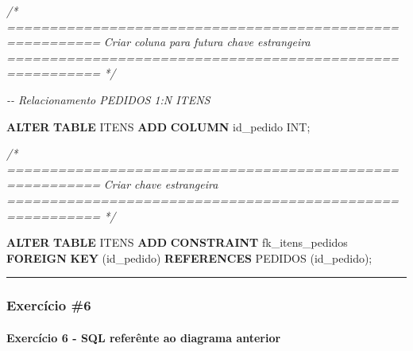 \documentclass[
]{book}
\newenvironment{Shaded}{\begin{snugshade}}{\end{snugshade}}
\newcommand{\CommentTok}[1]{\textcolor[rgb]{0.56,0.35,0.01}{\textit{#1}}}
\newcommand{\DataTypeTok}[1]{\textcolor[rgb]{0.13,0.29,0.53}{#1}}
\newcommand{\KeywordTok}[1]{\textcolor[rgb]{0.13,0.29,0.53}{\textbf{#1}}}
\newcommand{\NormalTok}[1]{#1}
\begin{document}
\begin{Shaded}
\begin{Highlighting}[]
\CommentTok{/* =========================================================}
\CommentTok{   Criar coluna para futura chave estrangeira}
\CommentTok{   ========================================================= */}

\CommentTok{{-}{-} Relacionamento PEDIDOS 1:N ITENS}

\KeywordTok{ALTER} \KeywordTok{TABLE}\NormalTok{ ITENS }\KeywordTok{ADD} \KeywordTok{COLUMN}\NormalTok{ id\_pedido }\DataTypeTok{INT}\NormalTok{;}

\CommentTok{/* =========================================================}
\CommentTok{   Criar chave estrangeira}
\CommentTok{   ========================================================= */}

\KeywordTok{ALTER} \KeywordTok{TABLE}\NormalTok{ ITENS }\KeywordTok{ADD} \KeywordTok{CONSTRAINT}\NormalTok{ fk\_itens\_pedidos }\KeywordTok{FOREIGN} \KeywordTok{KEY}\NormalTok{ (id\_pedido) }\KeywordTok{REFERENCES}\NormalTok{ PEDIDOS (id\_pedido);}

\end{Highlighting}
\end{Shaded}

\begin{center}\rule{0.5\linewidth}{0.5pt}\end{center}

\subsubsection{Exercício \#6}\label{exercuxedcio-6}



\paragraph{Exercício 6 - SQL referênte ao diagrama anterior}\label{exercuxedcio-6---sql-referuxeante-ao-diagrama-anterior}
\end{document}
